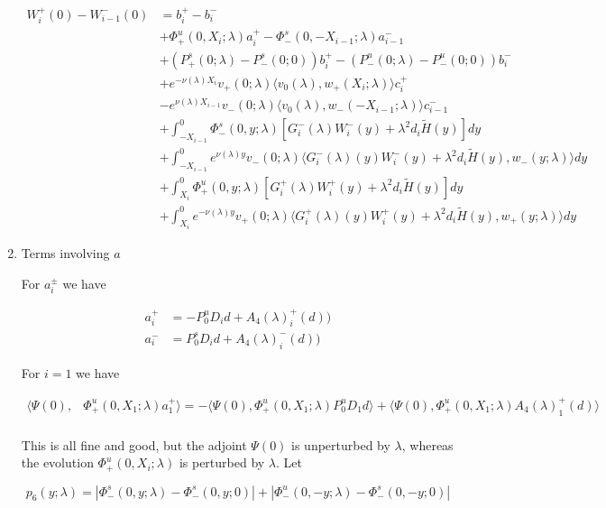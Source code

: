 \documentclass[12pt]{article}
\begin{document}
\begin{enumerate}
\begin{align*}
W_i^+(0) - W_{i-1}^-(0) &= b_i^+ - b_i^- \\
&+ \Phi^u_+(0, X_i; \lambda)a_i^+ - \Phi^s_-(0, -X_{i-1}; \lambda)a_{i-1}^- \\
&+(P^s_+(0; \lambda) - P^s_-(0; 0))b_i^+  - (P^u_-(0; \lambda) - P^u_-(0; 0))b_i^- \\
&+ e^{-\nu(\lambda)X_i} v_+(0; \lambda) \langle v_0(\lambda), w_+(X_i; \lambda) \rangle c_i^+ \\
&- e^{\nu(\lambda)X_{i-1}} v_-(0; \lambda) \langle v_0(\lambda), w_-(-X_{i-1}; \lambda) \rangle c_{i-1}^- \\
&+ \int_{-X_{i-1}}^0 \Phi^s_-(0, y; \lambda) [ G_i^-(\lambda)W_i^-(y) + \lambda^2 d_i \tilde{H}(y) ] dy \\
&+ \int_{-X_{i-1}}^0
e^{\nu(\lambda)y} v_-(0; \lambda) \langle G_i^-(\lambda)(y)W_i^-(y) + \lambda^2 d_i \tilde{H}(y), w_-(y; \lambda) \rangle dy \\
&+ \int_{X_i}^0 \Phi^u_+(0, y; \lambda) [ G_i^+(\lambda)W_i^+(y) + \lambda^2 d_i \tilde{H}(y) ] dy \\
&+ \int_{X_i}^0 e^{-\nu(\lambda)y} v_+(0; \lambda) \langle G_i^+(\lambda)(y)W_i^+(y) + \lambda^2 d_i \tilde{H}(y), w_+(y; \lambda) \rangle dy
\end{align*}

\item Terms involving $a$

For $a_i^\pm$ we have

\begin{align*}
a_i^+ &= -P^u_0 D_i d + A_4(\lambda)_i^+(d))\\
a_i^- &=  P^s_0 D_i d + A_4(\lambda)_i^-(d))
\end{align*}

For $i = 1$ we have

\begin{align*}
\langle \Psi(0), &\Phi^u_+(0, X_1; \lambda) a_1^+ \rangle = -\langle \Psi(0), \Phi^u_+(0, X_1; \lambda) P^u_0 D_1 d \rangle + \langle \Psi(0), \Phi^u_+(0, X_1; \lambda) A_4(\lambda)_1^+(d) \rangle \\
\end{align*} 

This is all fine and good, but the adjoint $\Psi(0)$ is unperturbed by $\lambda$, whereas the evolution $\Phi^u_+(0, X_i; \lambda)$ is perturbed by $\lambda$. Let

\[
p_6(y; \lambda) = |\Phi^s_-(0, y; \lambda) - \Phi^s_-(0, y; 0)| + |\Phi^u_-(0, -y; \lambda) - \Phi^s_-(0, -y; 0)| 
\]


\end{enumerate}
\end{document}
